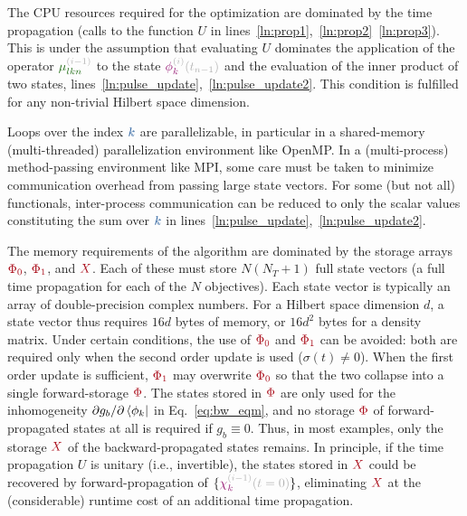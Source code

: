 \documentclass[aps,pra,twocolumn,notitlepage,letterpaper]{revtex4}
\newcommand{\VarScalar}[1]{{\color{clVarScalar}#1}}
\newcommand{\VarState}[1]{\ensuremath{\textcolor{clVarState}{#1}}}
\newcommand{\PropAnnotation}[1]{\textcolor{black!30}{#1}}
\newcommand{\VarPropState}[4]{\ensuremath{\VarState{#1}_{\textcolor{clVarState}{#2}}^{\PropAnnotation{#3}}\PropAnnotation{(#4)}}}  %
\newcommand{\VarOperator}[2]{{\color{clVarOperator}#1_{#2}}} %
\newcommand{\VarArray}[1]{{\color{clVarArray}#1}}
\begin{document}
The CPU resources required for the optimization are dominated by the time
propagation (calls to the function $U$ in
lines~\ref{ln:prop1},~\ref{ln:prop2}~\ref{ln:prop3}). This is under the
assumption that evaluating $U$ dominates the application of the operator
$\VarOperator{\mu^{\PropAnnotation{(i-1)}}}{lkn}$
to the state $\VarPropState{\phi}{k}{(i)}{t_{n-1}}$ and
the evaluation of the inner product of two states,
lines~\ref{ln:pulse_update},~\ref{ln:pulse_update2}.
This condition is fulfilled for any non-trivial Hilbert space dimension.

Loops over the index $\VarScalar{k}$ are parallelizable, in particular in a
shared-memory (multi-threaded) parallelization environment like OpenMP. In a
(multi-process) method-passing environment like MPI, some care must be taken to
minimize communication overhead from passing large state vectors.
For some (but not all) functionals, inter-process communication can be reduced
to only the scalar values constituting the sum over $\VarScalar{k}$ in
lines~\ref{ln:pulse_update},~\ref{ln:pulse_update2}.

The memory requirements of the algorithm are dominated by the storage arrays
$\VarArray{\Phi_0}$, $\VarArray{\Phi_1}$, and $\VarArray{X}$.
Each of these must store $N (N_T + 1)$ full state vectors (a full time
propagation for each of the $N$ objectives). Each state vector is typically an
array of double-precision complex numbers.
For a Hilbert space dimension $d$, a state vector thus requires $16 d$ bytes of
memory, or $16 d^2$ bytes for a density matrix.
Under certain conditions, the use of $\VarArray{\Phi_0}$ and $\VarArray{\Phi_1}$
can be avoided: both are required only when the second order update is used
($\sigma(t) \neq 0$). When the first order update is sufficient,
$\VarArray{\Phi_1}$ may overwrite $\VarArray{\Phi_0}$ so that the two collapse
into a single forward-storage $\VarArray{\Phi}$.
The states stored in $\VarArray{\Phi}$ are only used for the inhomogeneity
$\partial g_b / \partial \bra{\phi_k}$ in Eq.~\eqref{eq:bw_eqm}, and no storage
$\VarArray{\Phi}$ of forward-propagated states at all is required if $g_b \equiv
0$.
Thus, in most examples, only the storage $\VarArray{X}$ of the
backward-propagated states remains.
In principle, if the time propagation $U$ is unitary (i.e., invertible), the
states stored in $\VarArray{X}$ could be recovered by forward-propagation of
$\{\VarPropState{\chi}{k}{(i-1)}{t=0}\}$, eliminating $\VarArray{X}$ at the
(considerable) runtime cost of an additional time propagation.
\end{document}
